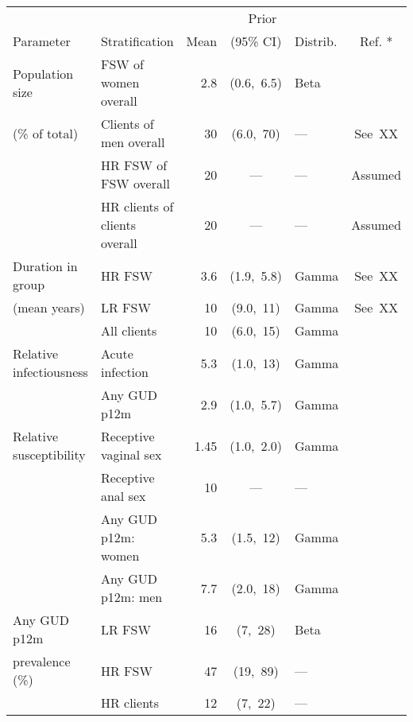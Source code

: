 \footnotesize
\begin{tabular}{llrclc}
  \toprule
                          &                                &  \multicolumn{3}{c}{Prior}   &         \\
  \cmidrule(rl){3-5}
  Parameter               & Stratification                 & Mean & (95\% CI)  & Distrib. &  Ref. * \\
  \midrule
  Population size         & FSW of women overall           &  2.8 & (0.6,~6.5) & Beta     &         \\
  (\% of total)           & Clients of men overall         &   30 & (6.0,~70)  & ---      & See~XX  \\
                          & HR FSW of FSW overall          &   20 &    ---     & ---      & Assumed \\
                          & HR clients of clients overall  &   20 &    ---     & ---      & Assumed \\[1ex]
  Duration in group       & HR FSW                         &  3.6 & (1.9,~5.8) & Gamma    & See~XX  \\
  (mean years)            & LR FSW                         &   10 & (9.0,~11)  & Gamma    & See~XX  \\
                          & All clients                    &   10 & (6.0,~15)  & Gamma    &         \\[1ex]
  Relative infectiousness & Acute infection                &  5.3 & (1.0,~13)  & Gamma    &         \\
                          & Any GUD p12m                   &  2.9 & (1.0,~5.7) & Gamma    &         \\[1ex]
  Relative susceptibility & Receptive vaginal sex          & 1.45 & (1.0,~2.0) & Gamma    &         \\
                          & Receptive anal sex             &   10 &    ---     & ---      &         \\
                          & Any GUD p12m: women            &  5.3 & (1.5,~12)  & Gamma    &         \\
                          & Any GUD p12m: men              &  7.7 & (2.0,~18)  & Gamma    &         \\[1ex]
  Any GUD p12m            & LR FSW                         &   16 &  (7,~28)   & Beta     &         \\
  prevalence (\%)         & HR FSW                         &   47 &  (19,~89)  & ---      &         \\
                          & HR clients                     &   12 &  (7,~22)   & ---      &         \\

\end{tabular}

